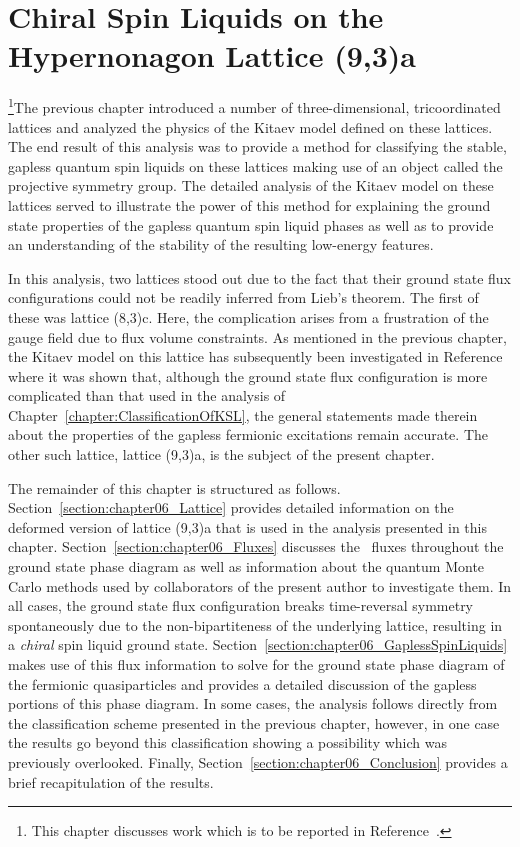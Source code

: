 \chapter{Chiral Spin Liquids on the Hypernonagon Lattice (9,3)a}
\label{chapter:HypernonagonLattice}
%
%
\footnote{This chapter discusses work which is to be reported in Reference~\cite{MischenkoPRB2019}.}The previous chapter introduced a number of three-dimensional, tricoordinated lattices and analyzed the physics of the Kitaev model defined on these lattices.
The end result of this analysis was to provide a method for classifying the stable, gapless quantum spin liquids on these lattices making use of an object called the projective symmetry group.
The detailed analysis of the Kitaev model on these lattices served to illustrate the power of this method for explaining the ground state properties of the gapless quantum spin liquid phases as well as to provide an understanding of the stability of the resulting low-energy features.

In this analysis, two lattices stood out due to the fact that their ground state flux configurations could not be readily inferred from Lieb's theorem.
The first of these was lattice (8,3)c.
Here, the complication arises from a frustration of the gauge field due to flux volume constraints.
As mentioned in the previous chapter, the Kitaev model on this lattice has subsequently been investigated in Reference~\cite{EschmannPRL2019} where it was shown that, although the ground state flux configuration is more complicated than that used in the analysis of Chapter~\ref{chapter:ClassificationOfKSL}, the general statements made therein about the properties of the gapless fermionic excitations remain accurate.
The other such lattice, lattice (9,3)a, is the subject of the present chapter.

The remainder of this chapter is structured as follows.
Section~\ref{section:chapter06_Lattice} provides detailed information on the deformed version of lattice (9,3)a that is used in the analysis presented in this chapter.
Section~\ref{section:chapter06_Fluxes} discusses the \ZZ~fluxes throughout the ground state phase diagram as well as information about the quantum Monte Carlo methods used by collaborators of the present author to investigate them.
In all cases, the ground state flux configuration breaks time-reversal symmetry spontaneously due to the non-bipartiteness of the underlying lattice, resulting in a \textit{chiral} spin liquid ground state.
Section~\ref{section:chapter06_GaplessSpinLiquids} makes use of this flux information to solve for the ground state phase diagram of the fermionic quasiparticles and provides a detailed discussion of the gapless portions of this phase diagram.
In some cases, the analysis follows directly from the classification scheme presented in the previous chapter, however, in one case the results go beyond this classification showing a possibility which was previously overlooked.
Finally, Section~\ref{section:chapter06_Conclusion} provides a brief recapitulation of the results.


